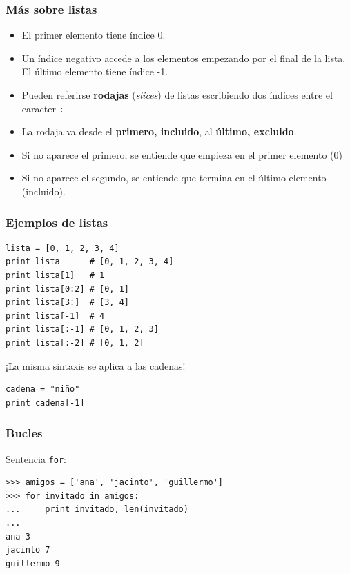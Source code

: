 \documentclass{beamer}
\begin{document}
\begin{frame}[fragile]
\frametitle{Más sobre listas}

\begin{itemize}
\item El primer elemento tiene índice 0.
\item Un índice negativo accede a los elementos empezando por el final
  de la lista. El último elemento tiene índice -1.
\item Pueden referirse {\bf rodajas} (\emph{slices}) de listas
  escribiendo dos índices entre el caracter \verb|:|
\item La rodaja va desde el {\bf primero, incluido}, al {\bf último,
    excluido}.
\item Si no aparece el primero, se entiende que empieza en el primer
  elemento (0)
\item Si no aparece el segundo, se entiende que termina en el último
  elemento (incluido). 
\end{itemize}
\end{frame}


\begin{frame}[fragile]
\frametitle{Ejemplos de listas}

  \begin{footnotesize}
\begin{verbatim}
lista = [0, 1, 2, 3, 4]
print lista      # [0, 1, 2, 3, 4]
print lista[1]   # 1 
print lista[0:2] # [0, 1]
print lista[3:]  # [3, 4]
print lista[-1]  # 4
print lista[:-1] # [0, 1, 2, 3]
print lista[:-2] # [0, 1, 2]
\end{verbatim}
  \end{footnotesize}
  \begin{center}
¡La misma sintaxis se aplica a las cadenas!
  \end{center}

  \begin{footnotesize}
\begin{verbatim}
cadena = "niño"
print cadena[-1]
\end{verbatim}
  \end{footnotesize}


\end{frame}


\begin{frame}[fragile]

\frametitle{ Bucles}
Sentencia \verb|for|:

\begin{footnotesize}
\begin{verbatim}
>>> amigos = ['ana', 'jacinto', 'guillermo']
>>> for invitado in amigos:
...     print invitado, len(invitado)
... 
ana 3
jacinto 7
guillermo 9 
\end{verbatim}
\end{footnotesize}



\end{frame}
\end{document}
